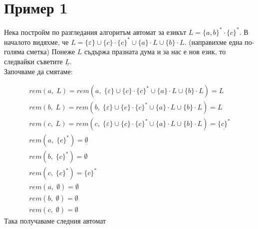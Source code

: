 \documentclass[12pt]{article}
\begin{document}
\section{Пример 1}
Нека постройм по разгледания алгоритъм автомат за езикът \(L = \{a, b\}^* \cdot \{c\}^*\).
В началото видяхме, че \(L = \{\varepsilon\} \cup \{c\} \cdot \{c\}^* \cup \{a\} \cdot L \cup \{b\} \cdot L\). (направихме една по-голяма сметка)
Понеже \(L\) съдържа празната дума и за нас е нов език, то следвайки съветите \(\boxed{\underline{L}}\). \\
Започваме да смятаме:

\begin{align*}
    rem(a, \; L) = rem(a, \; \{\varepsilon\} \cup \{c\} \cdot \{c\}^* \cup \{a\} \cdot L \cup \{b\} \cdot L) = L \\
    rem(b, \; L) = rem(b, \; \{\varepsilon\} \cup \{c\} \cdot \{c\}^* \cup \{a\} \cdot L \cup \{b\} \cdot L) = L \\
    rem(c, \; L) = rem(c, \; \{\varepsilon\} \cup \{c\} \cdot \{c\}^* \cup \{a\} \cdot L \cup \{b\} \cdot L) = \boxed{\underline{\{c\}^*}} \\
    rem(a, \; \{c\}^*) = \underline{\emptyset} \\
    rem(b, \; \{c\}^*) = \emptyset \\
    rem(c, \; \{c\}^*) = \{c\}^* \\
    rem(a, \; \emptyset) = \emptyset \\
    rem(b, \; \emptyset) = \emptyset \\
    rem(c, \; \emptyset) = \emptyset
\end{align*}
Така получаваме следния автомат
\begin{center}
\end{center}
\end{document}

